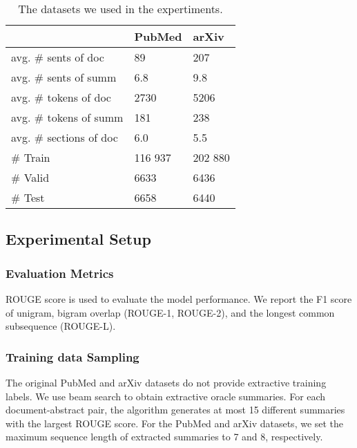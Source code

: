 \documentclass[11pt,a4paper]{article}
\begin{document}
\begin{table}[h]
  \centering
  \begin{tabular}{l|p{12mm}p{12mm}}\toprule
                                & PubMed    &   arXiv       \\ \midrule
     avg. \# sents of doc        & 89        &   207         \\
     avg. \# sents of summ       & 6.8         &   9.8          \\
     avg. \# tokens of doc       & 2730      &   5206        \\
     avg. \# tokens of summ      & 181       &   238         \\
     avg. \# sections of doc     & 6.0      &   5.5         \\\midrule
     \# Train                   & 116 937   &   202 880      \\
     \# Valid                   & 6633      &   6436        \\
     \# Test                    & 6658      &   6440        \\
     \bottomrule
\end{tabular}
\caption{The datasets we used in the expertiments.}\label{tab:dataset}
\end{table}
 
\subsection{Experimental Setup}

\subsubsection{Evaluation Metrics}
ROUGE score \cite{rouge_2004} is used to evaluate the model performance.
We report the F1 score of unigram, bigram overlap (ROUGE-1, ROUGE-2), and the longest common subsequence (ROUGE-L).

\subsubsection{Training data Sampling}
The original PubMed and arXiv datasets do not provide extractive training labels.
We use beam search to obtain extractive oracle summaries. For each document-abstract pair, the algorithm generates at most 15 different summaries with the largest ROUGE score. For the PubMed and arXiv datasets, we set the maximum sequence length of extracted summaries to 7 and 8, respectively.
\end{document}

